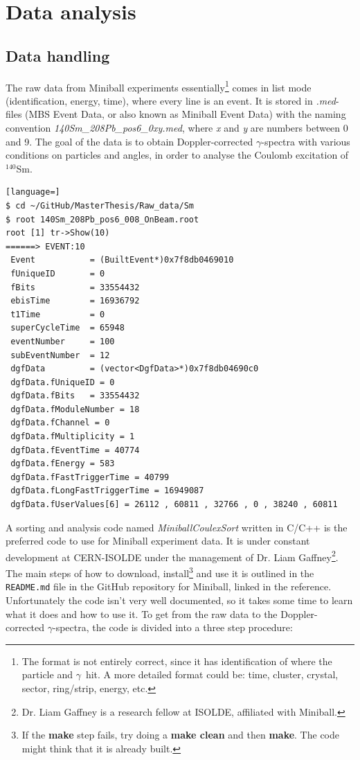 \documentclass[twoside,english]{uiofysmaster/uiofysmaster}
\newcommand{\Sm}{$^{140}$Sm} %
\newcommand{\ga}{$\gamma$}
\begin{document}


\chapter{Data analysis}  

\section{Data handling}
The raw data from Miniball experiments essentially\footnote{The format is not entirely correct, since it has identification of where the particle and \ga\ hit. A more detailed format could be: time, cluster, crystal, sector, ring/strip, energy, etc.} comes in list mode (identification, energy, time), where every line is an event. It is stored in \textit{.med}-files (MBS Event Data, or also known as Miniball Event Data) with the naming convention \textit{140Sm\_208Pb\_pos6\_0xy.med}, where \textit{x} and \textit{y} are numbers between 0 and 9. The goal of the data is to obtain Doppler-corrected \ga-spectra with various conditions on particles and angles, in order to analyse the Coulomb excitation of \Sm. 

\begin{lstlisting}[language=]
$ cd ~/GitHub/MasterThesis/Raw_data/Sm
$ root 140Sm_208Pb_pos6_008_OnBeam.root
root [1] tr->Show(10)
======> EVENT:10
 Event           = (BuiltEvent*)0x7f8db0469010
 fUniqueID       = 0
 fBits           = 33554432
 ebisTime        = 16936792
 t1Time          = 0
 superCycleTime  = 65948
 eventNumber     = 100
 subEventNumber  = 12
 dgfData         = (vector<DgfData>*)0x7f8db04690c0
 dgfData.fUniqueID = 0
 dgfData.fBits   = 33554432
 dgfData.fModuleNumber = 18
 dgfData.fChannel = 0
 dgfData.fMultiplicity = 1
 dgfData.fEventTime = 40774
 dgfData.fEnergy = 583
 dgfData.fFastTriggerTime = 40799
 dgfData.fLongFastTriggerTime = 16949087
 dgfData.fUserValues[6] = 26112 , 60811 , 32766 , 0 , 38240 , 60811
\end{lstlisting}

A sorting and analysis code named \textsl{MiniballCoulexSort} \cite{MBCS} written in C/C++ is the preferred code to use for Miniball experiment data. 
It is under constant development at CERN-ISOLDE under the management of Dr. Liam Gaffney\footnote{Dr. Liam Gaffney is a research fellow at ISOLDE, affiliated with Miniball.}. The main steps of how to download, install\footnote{If the \textbf{make} step fails, try doing a \textbf{make clean} and then \textbf{make}. The code might think that it is already built.} and use it is outlined in the \texttt{README.md} file in the GitHub repository for Miniball, linked in the reference. Unfortunately the code isn't very well documented, so it takes some time to learn what it does and how to use it. To get from the raw data to the Doppler-corrected \ga-spectra, the code is divided into a three step procedure:
\end{document}
